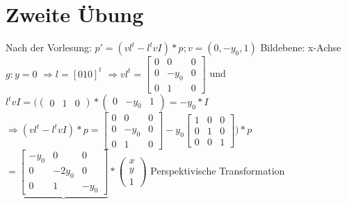 \documentclass[10pt,a4paper]{article}
\begin{document}
\section*{Zweite Übung}
Nach der Vorlesung:\newline
$ p'=(vl^t-l^tvI)*p ; v=(0,-y_0,1)$
\newline Bildebene: x-Achse $g:y=0$\newline
$\Longrightarrow l= [0 1 0]^t$\newline
$\Longrightarrow vl^t=\begin{bmatrix}
	0 & 0 & 0\\
	 0 & -y_0 & 0 \\
	 0 & 1 & 0 
\end{bmatrix}$
\newline und $ l^t vI=(\begin{pmatrix}
   0 & 1 & 0 \end{pmatrix}*\begin{pmatrix}
   0 & -y_0 & 1 \end{pmatrix} =-y_0*I$\newline
   $\Longrightarrow (vl^t-l^tvI)*p= \begin{bmatrix}
   0 & 0 & 0 \\
   0 & -y_0 & 0 \\
   0 & 1 & 0 \end{bmatrix}-y_0\begin{bmatrix}
   1 & 0 & 0 \\
   0 & 1 & 0 \\
   0 & 0 & 1
   \end{bmatrix})*p
   $ \newline$=\underbrace{\begin{bmatrix}
   -y_0 & 0 & 0 \\
   0 & -2y_0 & 0 \\
   0 & 1 & -y_0 \end{bmatrix}}*\begin{pmatrix}
   x\\
   y\\
   1\end{pmatrix}$\newline
   Perspektivische Transformation
\end{document}

